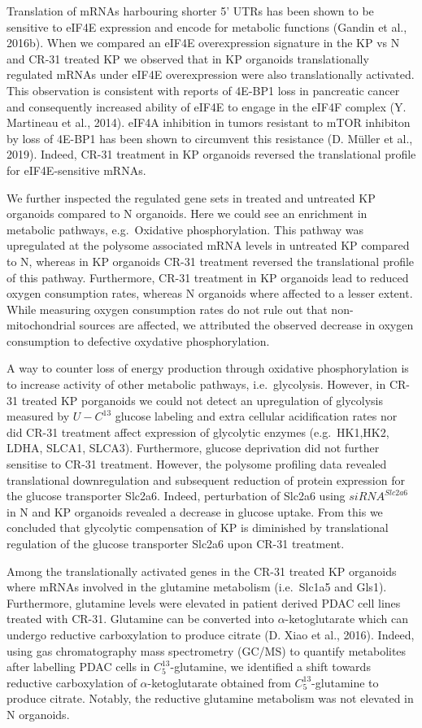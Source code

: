 \documentclass[12pt,openany]{book}
\begin{document}
Translation of mRNAs harbouring shorter 5' UTRs has been shown to be
sensitive to eIF4E expression and encode for metabolic functions (Gandin
et al., 2016b). When we compared an eIF4E overexpression signature in
the KP vs N and CR-31 treated KP we observed that in KP organoids
translationally regulated mRNAs under eIF4E overexpression were also
translationally activated. This observation is consistent with reports
of 4E-BP1 loss in pancreatic cancer and consequently increased ability
of eIF4E to engage in the eIF4F complex (Y. Martineau et al., 2014).
eIF4A inhibition in tumors resistant to mTOR inhibiton by loss of 4E-BP1
has been shown to circumvent this resistance (D. Müller et al., 2019).
Indeed, CR-31 treatment in KP organoids reversed the translational
profile for eIF4E-sensitive mRNAs.

We further inspected the regulated gene sets in treated and untreated KP
organoids compared to N organoids. Here we could see an enrichment in
metabolic pathways, e.g.~Oxidative phosphorylation. This pathway was
upregulated at the polysome associated mRNA levels in untreated KP
compared to N, whereas in KP organoids CR-31 treatment reversed the
translational profile of this pathway. Furthermore, CR-31 treatment in
KP organoids lead to reduced oxygen consumption rates, whereas N
organoids where affected to a lesser extent. While measuring oxygen
consumption rates do not rule out that non-mitochondrial sources are
affected, we attributed the observed decrease in oxygen consumption to
defective oxydative phosphorylation.

A way to counter loss of energy production through oxidative
phosphorylation is to increase activity of other metabolic pathways,
i.e.~glycolysis. However, in CR-31 treated KP porganoids we could not
detect an upregulation of glycolysis measured by \(U-C^{13}\) glucose
labeling and extra cellular acidification rates nor did CR-31 treatment
affect expression of glycolytic enzymes (e.g.~HK1,HK2, LDHA, SLCA1,
SLCA3). Furthermore, glucose deprivation did not further sensitise to
CR-31 treatment. However, the polysome profiling data revealed
translational downregulation and subsequent reduction of protein
expression for the glucose transporter Slc2a6. Indeed, perturbation of
Slc2a6 using \(siRNA^{Slc2a6}\) in N and KP organoids revealed a
decrease in glucose uptake. From this we concluded that glycolytic
compensation of KP is diminished by translational regulation of the
glucose transporter Slc2a6 upon CR-31 treatment.

Among the translationally activated genes in the CR-31 treated KP
organoids where mRNAs involved in the glutamine metabolism (i.e.~Slc1a5
and Gls1). Furthermore, glutamine levels were elevated in patient
derived PDAC cell lines treated with CR-31. Glutamine can be converted
into \(\alpha\)-ketoglutarate which can undergo reductive carboxylation
to produce citrate (D. Xiao et al., 2016). Indeed, using gas
chromatography mass spectrometry (GC/MS) to quantify metabolites after
labelling PDAC cells in \(C_5^{13}\)-glutamine, we identified a shift
towards reductive carboxylation of \(\alpha\)-ketoglutarate obtained
from \(C_5^{13}\)-glutamine to produce citrate. Notably, the reductive
glutamine metabolism was not elevated in N organoids.
\end{document}
